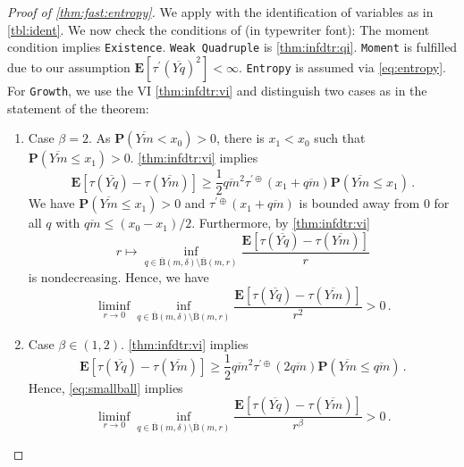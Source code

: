 \documentclass{article}
\newcommand{\ball}{\mathrm{B}}
\newcommand{\lab}{\left[} %
\newcommand{\rab}{\right]} %
\newcommand{\ab}[1]{\lab #1 \rab} %
\newcommand{\abOf}[1]{\!\ab{#1}} %
\newcommand{\lb}{\left(} %
\newcommand{\rb}{\right)} %
\newcommand{\br}[1]{\lb #1 \rb} %
\newcommand{\brOf}[1]{\!\br{#1}} %
\renewcommand{\Pr}{\mathbf{P}} %
\newcommand{\Prof}[1]{\Pr(#1)}
\newcommand{\PrOf}[1]{\Pr\brOf{#1}}
\newcommand{\E}{\mathbf{E}} %
\newcommand{\Eof}[1]{\E[#1]}
\newcommand{\EOf}[1]{\E\abOf{#1}}
\newcommand{\pr}{^\prime}
\newcommand{\eqfs}{\,.}
\newcommand{\ol}[2]{\overline{#1#2}}
\newcommand{\tran}{\tau}
\newcommand{\dtran}{\tau\pr}
\newcommand{\ddrtran}{\tau^{\prime\oplus}}
\newcommand{\ballclosed}{\overline{\ball}}
\begin{document}
\begin{proof}[Proof of \cref{thm:fast:entropy}]
    We apply \cite[Theorem 1]{schoetz19} with the identification of variables as in  \cref{tbl:ident}. We now check the conditions of \cite[Theorem 1]{schoetz19} (in typewriter font): The moment condition implies \texttt{Existence}. \texttt{Weak Quadruple} is \cref{thm:infdtr:qi}. \texttt{Moment} is fulfilled due to our assumption $\Eof{\dtran(\ol Yq)^2} < \infty$. \texttt{Entropy} is assumed via \eqref{eq:entropy}. For \texttt{Growth}, we use the VI \cref{thm:infdtr:vi} and distinguish two cases as in the statement of the theorem: 
    \begin{enumerate}[label=(\roman*)]
        \item
        Case $\beta=2$.
        As $\Prof{\ol Ym < x_0} > 0$, there is $x_1<x_0$ such that $\PrOf{\ol Ym \leq x_1} > 0$. \cref{thm:infdtr:vi} implies
        \begin{equation}
            \EOf{\tran(\ol Yq) - \tran(\ol Ym)}
            \geq
            \frac12 \ol qm^2 \ddrtran(x_1 + \ol qm) \PrOf{\ol Ym \leq x_1}
            \eqfs
        \end{equation}
        We have $\Prof{\ol Ym \leq x_1}>0$ and $\ddrtran(x_1 + \ol qm)$ is bounded away from 0 for all $q$ with $\ol qm \leq (x_0-x_1)/2$.
        Furthermore, by \cref{thm:infdtr:vi}
        \begin{equation}
            r\mapsto \inf_{q\in\ballclosed(m,\delta)\setminus \ballclosed(m,r)} \frac{\EOf{\tran(\ol Yq)-\tran(\ol Ym)}}{r}
        \end{equation}
        is nondecreasing. Hence, we have
        \begin{equation}
            \liminf_{r\to0} \inf_{q\in\ballclosed(m,\delta)\setminus \ballclosed(m,r)} \frac{\EOf{\tran(\ol Yq)-\tran(\ol Ym)}}{r^2} > 0
            \eqfs
        \end{equation}
        \item 
        Case $\beta\in(1,2)$.
        \cref{thm:infdtr:vi} implies
        \begin{equation}
            \EOf{\tran(\ol Yq) - \tran(\ol Ym)}
            \geq
            \frac12 \ol qm^2 \ddrtran(2\ol qm) \PrOf{\ol Ym \leq \ol qm}
            \eqfs
        \end{equation}
        Hence, \eqref{eq:smallball} implies
        \begin{equation}
            \liminf_{r\to0} \inf_{q\in\ballclosed(m,\delta)\setminus \ballclosed(m,r)} \frac{\EOf{\tran(\ol Yq)-\tran(\ol Ym)}}{r^\beta} > 0
            \eqfs
        \end{equation}

\end{enumerate}
\end{proof}
\end{document}
